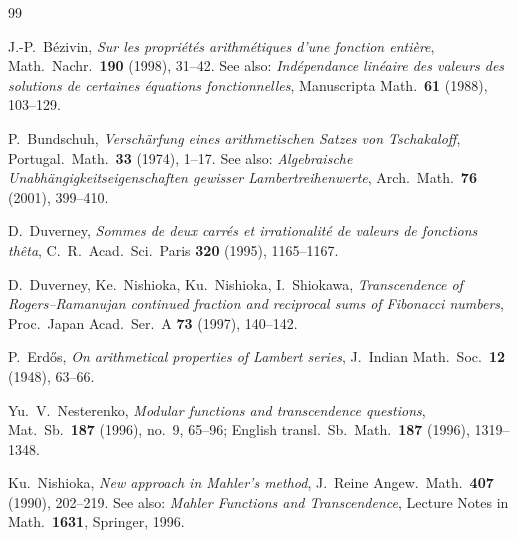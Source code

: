 \documentclass[12pt]{amsart}
\theoremstyle{definition}
\theoremstyle{remark}
\begin{document}
\begin{thebibliography}{99}

J.-P.\ B\'ezivin,
\emph{Sur les propri\'et\'es arithm\'etiques d'une fonction
enti\`ere},
Math.\ Nachr.\ \textbf{190} (1998), 31--42.
See also: \emph{Ind\'ependance lin\'eaire des valeurs des solutions
de certaines \'equations fonctionnelles}, Manuscripta Math.\
\textbf{61} (1988), 103--129.

P.\ Bundschuh,
\emph{Verschärfung eines arithmetischen Satzes von Tschakaloff},
Portugal.\ Math.\ \textbf{33} (1974), 1--17.
See also: \emph{Algebraische Unabhängigkeitseigenschaften
gewisser Lambertreihenwerte}, Arch.\ Math.\ \textbf{76} (2001),
399--410.

D.\ Duverney,
\emph{Sommes de deux carr\'es et irrationalit\'e de valeurs de
fonctions th\^eta},
C.\ R.\ Acad.\ Sci.\ Paris \textbf{320} (1995), 1165--1167.

D.\ Duverney, Ke.\ Nishioka, Ku.\ Nishioka, I.\ Shiokawa,
\emph{Transcendence of Rogers--Ramanujan continued fraction and
reciprocal sums of Fibonacci numbers},
Proc.\ Japan Acad.\ Ser.\ A \textbf{73} (1997), 140--142.

P.\ Erd\H{o}s,
\emph{On arithmetical properties of Lambert series},
J.\ Indian Math.\ Soc.\ \textbf{12} (1948), 63--66.

Yu.\ V.\ Nesterenko,
\emph{Modular functions and transcendence questions},
Mat.\ Sb.\ \textbf{187} (1996), no.~9, 65--96;
English transl.\ Sb.\ Math.\ \textbf{187} (1996), 1319--1348.

Ku.\ Nishioka,
\emph{New approach in Mahler's method},
J.\ Reine Angew.\ Math.\ \textbf{407} (1990), 202--219.
See also: \emph{Mahler Functions and Transcendence},
Lecture Notes in Math.\ \textbf{1631}, Springer, 1996.

\end{thebibliography}
\end{document}
